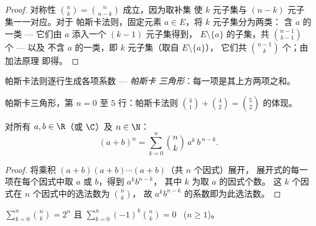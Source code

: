 \begin{proof}
对称性 $\binom nk = \binom{n}{n-k}$ 成立，因为取补集
使 $k$ 元子集与 $(n-k)$ 元子集一一对应。对于
帕斯卡法则，固定元素 $a \in E$，将 $k$ 元子集分为两类：
含 $a$ 的一类 --- 它们由 $a$ 添入一个 $(k-1)$ 元子集得到，
$E \setminus \{a\}$ 的子集，共 $\binom{n-1}{k-1}$ 个 --- 以及
不含 $a$ 的一类，即 $k$ 元子集（取自 $E \setminus \{a\}$），
它们共 $\binom{n-1}{k}$ 个；由加法原理
即得。
\end{proof}

帕斯卡法则逐行生成各项系数 --- \emph{帕斯卡
三角形}：每一项是其上方两项之和。

\begin{omfigure}

{\small 帕斯卡三角形，第 $n = 0$ 至 $5$ 行：帕斯卡法则
$\binom{4}{1} + \binom{4}{2} = \binom{5}{2}$ 的体现。}
\end{omfigure}

\begin{theorem}[二项式定理]\label{thm:g12:comb:binomial}
对所有 $a, b \in \R$（或 $\C$）及 $n \in \N$：
\[
(a+b)^n = \sum_{k=0}^{n} \binom{n}{k}\, a^{k}\, b^{\,n-k} .
\]
\end{theorem}

\begin{proof}
将乘积 $(a+b)(a+b)\cdots(a+b)$（共 $n$ 个因式）展开，
展开式的每一项在每个因式中取 $a$ 或 $b$，得到 $a^k b^{n-k}$，
其中 $k$ 为取 $a$ 的因式个数。
这 $k$ 个因式在 $n$ 个因式中的选法数为 $\binom nk$，
故 $a^k b^{n-k}$ 的系数即为此选法数。
\end{proof}

\begin{corollary}\label{cor:g12:comb:sums}
$\displaystyle\sum_{k=0}^{n} \binom{n}{k} = 2^n$
\quad 且 \quad
$\displaystyle\sum_{k=0}^{n} (-1)^k\binom{n}{k} = 0$ \ ($n \geq 1$)。
\end{corollary}

